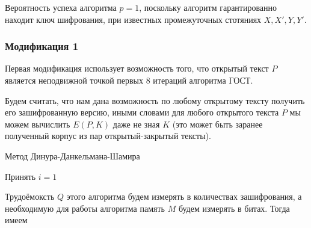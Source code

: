 \documentclass[a4paper,12pt]{article}
\theoremstyle{definition}
\begin{document}
	Вероятность успеха алгоритма $p = 1$, поскольку алгоритм гарантированно находит ключ шифрования, при известных промежуточных стотяниях $X, X', Y, Y'$.
	
	\subsubsection*{Модификация 1}
	
	Первая модификация использует возможность того, что открытый текст $P$ является неподвижной точкой первых 8 итераций алгоритма ГОСТ.	
	
	Будем считать, что нам дана возможность по любому открытому тексту получить его зашифрованную версию, иными словами для любого открытого текста $P$ мы можем вычислить $E(P, K)$ даже не зная $K$ (это может быть заранее полученный корпус из пар открытый-закрытый тексты).
	
		
	\begin{algorithm}[H]
		
		\caption{Метод Динура-Данкельмана-Шамира}
		\label{alg:DDS:first}
		\SetAlgoNoEnd 
		
		
		
		Принять $i=1$
		
	\end{algorithm}

	Трудоёмоксть $Q$ этого алгоритма будем измерять в количествах зашифрования, а необходимую для работы алгоритма память $M$ будем измерять в битах. Тогда имеем
	
\end{document}
